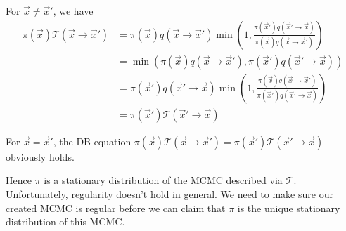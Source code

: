 For $\vec x \neq \vec x'$, we have
\begin{align}
    \pi(\vec x)\mathcal T(\vec x \to \vec x')   &= \pi(\vec x) q(\vec x \to \vec x') \min\left(1, \frac{\pi(\vec x') q(\vec x' \to \vec x)}{\pi(\vec x) q(\vec x \to \vec x')} \right) \\
                                                &= \min\left( \pi(\vec x) q(\vec x \to \vec x'), \pi(\vec x') q(\vec x' \to \vec x) \right) \\
                                                &= \pi(\vec x') q(\vec x' \to \vec x) \min\left( 1, \frac{\pi(\vec x) q(\vec x \to \vec x')}{\pi(\vec x') q(\vec x' \to \vec x)} \right) \\
                                                &= \pi(\vec x') \mathcal T(\vec x' \to \vec x)
\end{align}

For $\vec x = \vec x'$, the DB equation $\pi(\vec x)\mathcal T(\vec x \to \vec x') = \pi(\vec x') \mathcal T(\vec x' \to \vec x)$ obviously holds.

Hence $\pi$ is a stationary distribution of the MCMC described via $\mathcal T$. Unfortunately, regularity doesn't hold in general. We need to make sure our created MCMC is regular before we can claim that $\pi$ is the unique stationary distribution of this MCMC.